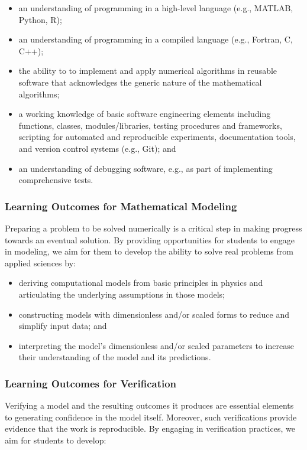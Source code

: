 \documentclass[graybox,envcountchap,sectrefs]{svmult}
\begin{document}
\begin{itemize}
\item an understanding of programming in a high-level language (e.g., MATLAB, Python, R);

\item an understanding of programming in a compiled language (e.g., Fortran, C, C++);

\item the ability to to implement and apply numerical algorithms in reusable software that acknowledges the generic nature of the mathematical algorithms;

\item a working knowledge of basic software engineering elements including functions, classes, modules/libraries, testing procedures and frameworks, scripting for automated and reproducible experiments, documentation tools, and version control systems (e.g., Git); and

\item an understanding of debugging software, e.g., as part of implementing comprehensive tests.
\end{itemize}


\subsubsection{Learning Outcomes for Mathematical Modeling}
Preparing a problem to be solved numerically is a critical step in making progress towards an eventual solution. By providing opportunities for students to engage in modeling, we aim for them to develop the ability to solve real problems from applied sciences by:

\begin{itemize}
\item deriving computational models from basic principles in physics and articulating the underlying assumptions in those models;

\item constructing models with dimensionless and/or scaled forms to reduce and simplify input data; and

\item interpreting the model's dimensionless and/or scaled parameters to increase their understanding of the model and its predictions.
\end{itemize}


\subsubsection{Learning Outcomes for Verification}
Verifying a model and the resulting outcomes it produces are essential elements to generating confidence in the model itself. Moreover, such verifications provide evidence that the work is reproducible. By engaging in verification practices, we aim for students to develop:
\end{document}
